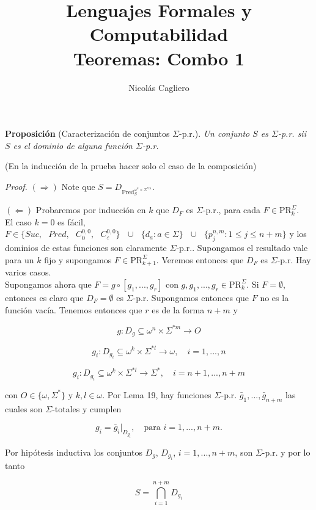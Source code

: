 \documentclass{article}
\title{Lenguajes Formales y Computabilidad \\
        \large Teoremas: Combo 1 }
\author{Nicolás Cagliero}
\begin{document}
\maketitle

\textbf{Proposición} (Caracterización de conjuntos $\Sigma$-p.r.). \textit{Un conjunto $S$ es $\Sigma$-p.r. sii $S$ es el dominio de alguna función $\Sigma$-p.r.}
\medskip

(En la inducción de la prueba hacer solo el caso de la composición)
\medskip

\textit{Proof.} $(\Rightarrow)$ Note que $S = D_{\text{Pred}_{S}^{\omega^n \times \Sigma^{*m}}}$.

$(\Leftarrow)$ Probaremos por inducción en $k$ que $D_F$ es $\Sigma$-p.r., para cada $F \in \text{PR}^{\Sigma}_{k}$.\\

El caso $k = 0$ es fácil, $F \in \{Suc, \text{ } Pred, \text{ } C_0^{0,0}, \text{ } C_{\varepsilon}^{0,0}\} \text{ } \cup \text{ } \{d_a : a \in \Sigma\} \text{ } \cup \text{ } \{p_j^{n,m} : 1 \leq j \leq n + m\}$ y los dominios de estas funciones son claramente $\Sigma$-p.r.. Supongamos el resultado vale para un $k$ fijo y supongamos $F \in \text{PR}^{\Sigma}_{k+1}$. Veremos entonces que $D_F$ es $\Sigma$-p.r. Hay varios casos.\\

Supongamos ahora que $F = g \circ [g_1, ..., g_r]$ con $g, g_1, ..., g_r \in \text{PR}^{\Sigma}_k$. Si $F = \emptyset$, entonces es claro que $D_F = \emptyset$ es $\Sigma$-p.r. Supongamos entonces que $F$ no es la función vacía. Tenemos entonces que $r$ es de la forma $n + m$ y

\[
g : D_g \subseteq \omega^n \times \Sigma^{*m} \to O
\]

\[
g_i : D_{g_i} \subseteq \omega^k \times \Sigma^{*l} \to \omega, \quad i = 1, ..., n
\]

\[
g_i : D_{g_i} \subseteq \omega^k \times \Sigma^{*l} \to \Sigma^*, \quad i = n + 1, ..., n + m
\]

con $O \in \{\omega, \Sigma^*\}$ y $k, l \in \omega$. Por Lema 19, hay funciones $\Sigma$-p.r. $\bar{g}_1, ..., \bar{g}_{n+m}$ las cuales son $\Sigma$-totales y cumplen

\[
g_i = \bar{g}_i|_{D_{g_i}}, \quad \text{para } i = 1, ..., n + m.
\]

Por hipótesis inductiva los conjuntos $D_g$, $D_{g_i}$, $i = 1, ..., n+m$, son $\Sigma$-p.r. y por lo tanto

\[
S = \bigcap_{i=1}^{n+m} D_{g_i}
\]
\end{document}
